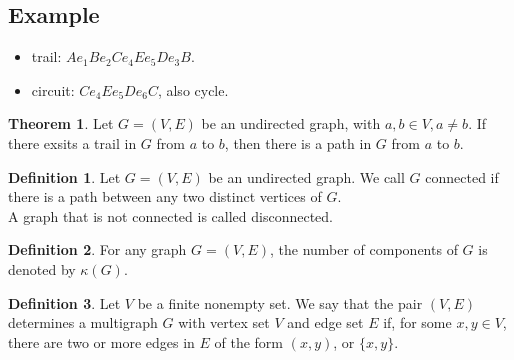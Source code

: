 \documentclass[letter]{book}
\theoremstyle{definition}
\newtheorem{theorem}{Theorem}[chapter]
\theoremstyle{definition}
\newtheorem{mydef}{Definition}[chapter]
\theoremstyle{remark}
\begin{document}
\subsection*{Example}
    \begin{center}
    \end{center}
    \begin{itemize}
        \item trail: $Ae_1Be_2Ce_4Ee_5De_3B$.
        \item circuit: $Ce_4Ee_5De_6C$, also cycle.
    \end{itemize}
\bigskip
\begin{theorem}\label{11.1}
    Let $G=(V,E)$ be an undirected graph, with $a,b\in V, a\neq b$. If there exsits a trail in $G$ from $a$ to $b$, then there is a path in $G$ from $a$ to $b$.
\end{theorem}
\bigskip
\begin{mydef}
    Let $G=(V,E)$ be an undirected graph. We call $G$ connected if there is a path between any two distinct vertices of $G$.\\
    A graph that is not connected is called disconnected.
\end{mydef}
\bigskip
\begin{mydef}
    For any graph $G=(V,E)$, the number of components of $G$ is denoted by $\kappa(G)$.
\end{mydef}
\bigskip
\begin{mydef}
    Let $V$ be a finite nonempty set. We say that the pair $(V,E)$ determines a multigraph $G$ with vertex set $V$ and edge set $E$ if, for some $x,y\in V$, there are two or more edges in $E$ of the form $(x,y)$, or $\{x,y\}$.
\end{mydef}
\end{document}
